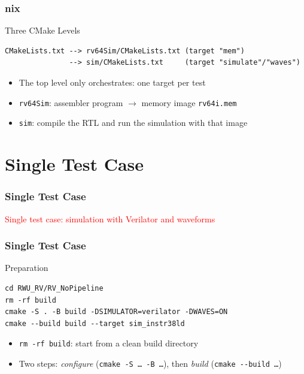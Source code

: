 \documentclass{beamer}
\newcommand{\astitle}{nix}
\newcommand{\assubtitle}{nix}
\newcommand{\cmd}[1]{\texttt{#1}}
\begin{document}
\renewcommand{\assubtitle}{Three CMake Levels}
\begin{frame}[fragile]
\frametitle{\astitle}
\begin{block}{\assubtitle}
\begin{lstlisting}[basicstyle=\ttfamily\scriptsize]
CMakeLists.txt --> rv64Sim/CMakeLists.txt (target "mem")
               --> sim/CMakeLists.txt     (target "simulate"/"waves")
\end{lstlisting}
  \begin{itemize}
    \item The top level only orchestrates: one target per test
    \item \cmd{rv64Sim}: assembler program $\rightarrow$ memory image \cmd{rv64i.mem}
    \item \cmd{sim}: compile the RTL and run the simulation with that image
  \end{itemize}
\end{block}
\end{frame}

\section{Single Test Case}
\renewcommand{\astitle}{Single Test Case}
\begin{frame}
\frametitle{\astitle}
\textcolor{red}{Single test case: simulation with Verilator and waveforms}
\end{frame}

\renewcommand{\assubtitle}{Preparation}
\begin{frame}[fragile]
\frametitle{\astitle}
\begin{block}{\assubtitle}
\begin{lstlisting}[style=sh,basicstyle=\ttfamily\small]
cd RWU_RV/RV_NoPipeline
rm -rf build
cmake -S . -B build -DSIMULATOR=verilator -DWAVES=ON
cmake --build build --target sim_instr38ld
\end{lstlisting}
  \begin{itemize}
    \item \cmd{rm -rf build}: start from a clean build directory
    \item Two steps: \emph{configure} (\cmd{cmake -S \dots{} -B \dots}),
      then \emph{build} (\cmd{cmake -{}-build \dots})
  \end{itemize}
\end{block}
\end{frame}
\end{document}
